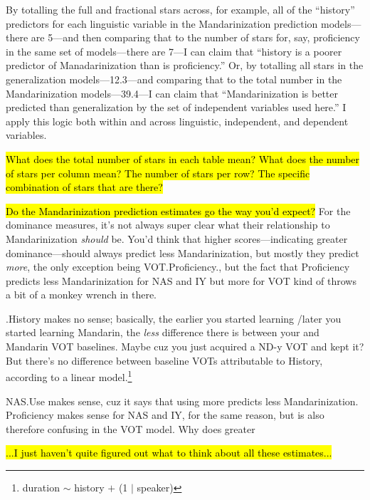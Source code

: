 By totalling the full and fractional stars across, for example, all of the ``history'' predictors for each linguistic variable in the Mandarinization prediction models---there are 5---and then comparing that to the number of stars for, say, proficiency in the same set of models---there are 7---I can claim that ``history is a poorer predictor of Manadarinization than is proficiency.'' Or, by totalling all stars in the generalization models---12.3---and comparing that to the total number in the Mandarinization models---39.4---I can claim that ``Mandarinization is better predicted than generalization by the set of independent variables used here.'' I apply this logic both within and across linguistic, independent, and dependent variables.

\hl{What does the total number of stars in each table mean? What does the number of stars per column mean? The number of stars per row? The specific combination of stars that are there?}

\hl{Do the Mandarinization prediction estimates go the way you'd expect?} For the dominance measures, it's not always super clear what their relationship to Mandarinization \emph{should} be. You'd think that higher scores---indicating greater \ND{} dominance---should always predict less Mandarinization, but mostly they predict \emph{more}, the only exception being VOT.Proficiency., but the fact that Proficiency predicts less Mandarinization for NAS and IY but more for VOT kind of throws a bit of a monkey wrench in there.

.History makes no sense; basically, the earlier you started learning \ND{}\slash later you started learning Mandarin, the \emph{less} difference there is between your \ND{} and Mandarin VOT baselines. Maybe cuz you just acquired a ND-y VOT and kept it? But there's no difference between \ND{} baseline VOTs attributable to History, according to a linear model.\footnote{duration $\sim$ history $+$ (1 $|$ speaker)}

NAS.Use makes sense, cuz it says that using \ND{} more predicts less Mandarinization. Proficiency makes sense for NAS and IY, for the same reason, but is also therefore confusing in the VOT model. Why does greater 

\hl{...I just haven't quite figured out what to think about all these estimates...}

